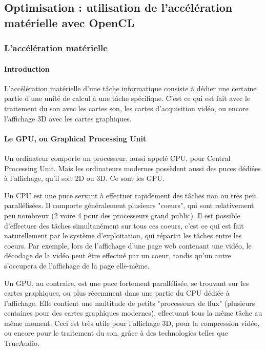 

\subsection{Optimisation : utilisation de l'accélération matérielle avec OpenCL}

\subsubsection{L'accélération matérielle}

\paragraph{Introduction}
L'accélération matérielle d'une tâche informatique consiste à dédier une certaine partie d'une unité de calcul à une tâche spécifique. 
C'est ce qui est fait avec le traitement du son avec les cartes son, les cartes d'acquisition vidéo, ou encore l'affichage 3D avec les cartes graphiques.

\paragraph{Le GPU, ou Graphical Processing Unit}

Un ordinateur comporte un processeur, aussi appelé CPU, pour Central Processing Unit. Mais les ordinateurs modernes possèdent aussi des puces dédiées à l'affichage, qu'il soit 2D ou 3D. Ce sont les GPU.

Un CPU est une puce servant à effectuer rapidement des tâches non ou très peu parallélisées. Il comporte généralement plusieurs "coeurs", qui sont relativement peu nombreux (2 voire 4 pour des processeurs grand public). Il est possible d'effectuer des tâches simultanément sur tous ces coeurs, c'est ce qui est fait naturellement par le système d'exploitation, qui répartit les tâches entre les coeurs. Par exemple, lors de l'affichage d'une page web contenant une vidéo, le décodage de la vidéo peut être effectué par un coeur, tandis qu'un autre s'occupera de l'affichage de la page elle-même.

Un GPU, au contraire, est une puce fortement parallélisée, se trouvant sur les cartes graphiques, ou plus récemment dans une partie du CPU dédiée à l'affichage. Elle contient une multitude de petits "processeurs de flux" (plusieurs centaines pour des cartes graphiques modernes), effectuant tous la même tâche au même moment. Ceci est très utile pour l'affichage 3D, pour la compression vidéo, ou encore pour le traitement du son, grâce à des technologies telles que TrueAudio.

